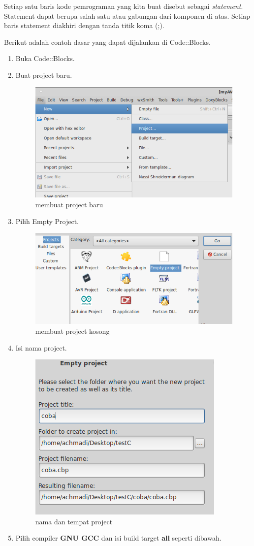 \documentclass[12pt,]{article}
\begin{document}
	Setiap satu baris kode pemrograman yang kita buat disebut sebagai \textit{statement}.
	Statement dapat berupa salah satu atau gabungan dari komponen di atas.
	Setiap baris statement diakhiri dengan tanda titik koma (;).
	
	Berikut adalah contoh dasar yang dapat dijalankan di Code::Blocks.
	\begin{enumerate}
		\item Buka Code::Blocks.
		\item Buat project baru.
		\begin{figure}[H]
			\centering
			\includegraphics[width=0.5\linewidth]{images/c_cb_0}
			\caption{membuat project baru}
		\end{figure}
		\item Pilih Empty Project.
		\begin{figure}[H]
			\centering
			\includegraphics[width=0.4\linewidth]{images/c_cb_1}
			\caption{membuat project kosong}
		\end{figure}
		\item Isi nama project.
		\begin{figure}[H]
			\centering
			\includegraphics[width=0.35\linewidth]{images/c_cb_2}
			\caption{nama dan tempat project}
		\end{figure}
		\item Pilih compiler \textbf{GNU GCC} dan isi build target \textbf{all} seperti dibawah.
		\begin{figure}[H]

\end{figure}
\end{enumerate}
\end{document}
